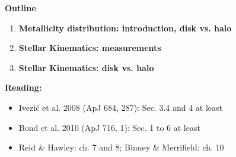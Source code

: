 \documentclass[letterpaper,landscape]{slides}
\begin{document}
\begin{slide}
\begin{center}
\bfseries
{\large {\color{blue} Outline} }
\end{center}
\vskip -1.2in

\begin{enumerate}
            \item {\bf Metallicity distribution: introduction, disk vs. halo}
             \item {\bf Stellar Kinematics: measurements}
             \item {\bf Stellar Kinematics: disk vs. halo}
\end{enumerate}
\vskip -0.3in
{\color{red} \bf Reading:}
\vskip -0.3in
   \begin{itemize}
   \item {\color{blue} Ivezi\'{c} et al. 2008 (ApJ 684, 287):} Sec. 3.4 and 4 at least
   \item {\color{blue} Bond et al. 2010 (ApJ 716, 1):} Sec. 1 to 6 at least 
   \item {Reid \& Hawley:} ch. 7 and 8; {Binney \& Merrifield:} ch. 10
\end{itemize}


\vfill
\end{slide}
 



\end{document}
